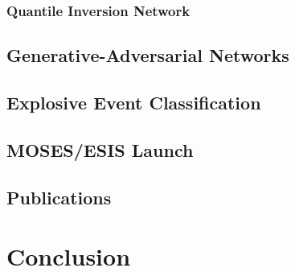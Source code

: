 \documentclass[10pt,letterpaper]{article}
\begin{document}
			\subsubsection{Quantile Inversion Network}
			
			\subsection{Generative-Adversarial Networks}	\label{sec_gan}
		
		\subsection{Explosive Event Classification}
		
			
		
		\subsection{MOSES/ESIS Launch}
		
		\subsection{Publications}
	
	\section{Conclusion}
	
\end{document}
